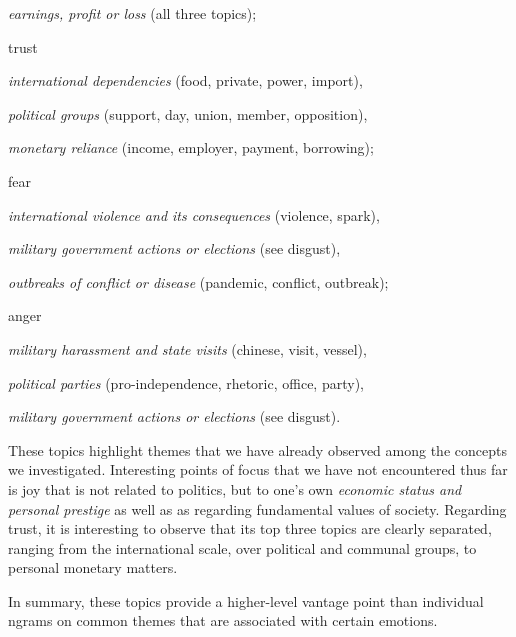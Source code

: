 \begin{aenumerate}
	\begin{aenumerate}
		\item \textit{earnings, profit or loss} (all three topics);
	\end{aenumerate}
	\item trust
	\begin{aenumerate}
		\item \textit{international dependencies} (food, private, power, import),
		\item \textit{political groups} (support, day, union, member, opposition),
		\item \textit{monetary reliance} (income, employer, payment, borrowing);
	\end{aenumerate}
	\item fear
	\begin{aenumerate}
		\item \textit{international violence and its consequences} (violence, spark),
		\item \textit{military government actions or elections} (see disgust),
		\item \textit{outbreaks of conflict or disease} (pandemic, conflict, outbreak);
	\end{aenumerate}
	\item anger
	\begin{aenumerate}
		\item \textit{military harassment and state visits} (chinese, visit, vessel),
		\item \textit{political parties} (pro-independence, rhetoric, office, party),
		\item \textit{military government actions or elections} (see disgust).
	\end{aenumerate}
\end{aenumerate}

These topics highlight themes that we have already observed among the concepts we investigated. Interesting points of focus that we have not encountered thus far is joy that is not related to politics, but to one's own \textit{economic status and personal prestige} as well as as regarding fundamental values of society. Regarding trust, it is interesting to observe that its top three topics are clearly separated, ranging from the international scale, over political and communal groups, to personal monetary matters.

In summary, these topics provide a higher-level vantage point than individual ngrams on common themes that are associated with certain emotions.